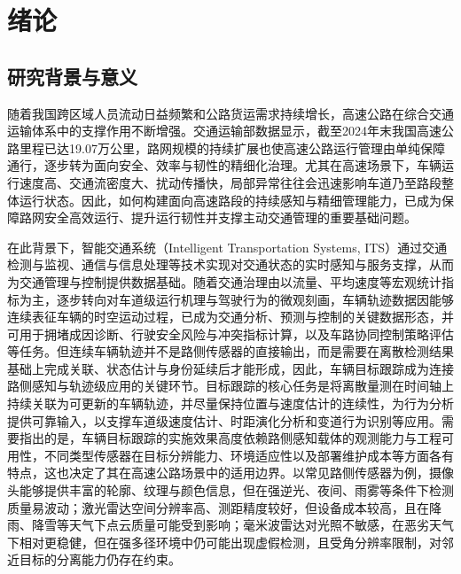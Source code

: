 \documentclass{xdupgthesis}
\begin{document}
\chapter{绪论}

\section{研究背景与意义}

随着我国跨区域人员流动日益频繁和公路货运需求持续增长，高速公路在综合交通运输体系中的支撑作用不断增强。交通运输部数据显示，截至2024年末我国高速公路里程已达19.07万公里\cite{mot2024statisticalbulletin}，路网规模的持续扩展也使高速公路运行管理由单纯保障通行，逐步转为面向安全、效率与韧性的精细化治理。尤其在高速场景下，车辆运行速度高、交通流密度大、扰动传播快，局部异常往往会迅速影响车道乃至路段整体运行状态。因此，如何构建面向高速路段的持续感知与精细管理能力，已成为保障路网安全高效运行、提升运行韧性并支撑主动交通管理的重要基础问题。

在此背景下，智能交通系统（Intelligent Transportation Systems, ITS）通过交通检测与监视、通信与信息处理等技术实现对交通状态的实时感知与服务支撑，从而为交通管理与控制提供数据基础\cite{mimbela2007vdstits}。随着交通治理由以流量、平均速度等宏观统计指标为主，逐步转向对车道级运行机理与驾驶行为的微观刻画，车辆轨迹数据因能够连续表征车辆的时空运动过程，已成为交通分析、预测与控制的关键数据形态\cite{liu2025trajectorysurvey}，并可用于拥堵成因诊断、行驶安全风险与冲突指标计算，以及车路协同控制策略评估等任务。但连续车辆轨迹并不是路侧传感器的直接输出，而是需要在离散检测结果基础上完成关联、状态估计与身份延续后才能形成，因此，车辆目标跟踪成为连接路侧感知与轨迹级应用的关键环节。目标跟踪的核心任务是将离散量测在时间轴上持续关联为可更新的车辆轨迹，并尽量保持位置与速度估计的连续性，为行为分析提供可靠输入，以支撑车道级速度估计、时距演化分析和变道行为识别等应用。需要指出的是，车辆目标跟踪的实施效果高度依赖路侧感知载体的观测能力与工程可用性，不同类型传感器在目标分辨能力、环境适应性以及部署维护成本等方面各有特点，这也决定了其在高速公路场景中的适用边界。以常见路侧传感器为例，摄像头能够提供丰富的轮廓、纹理与颜色信息，但在强逆光、夜间、雨雾等条件下检测质量易波动\cite{Pandharipande2023Perception}；激光雷达空间分辨率高、测距精度较好，但设备成本较高，且在降雨、降雪等天气下点云质量可能受到影响\cite{Pandharipande2023Perception,Wu2025LiDARAdverseWeather}；毫米波雷达对光照不敏感，在恶劣天气下相对更稳健，但在强多径环境中仍可能出现虚假检测，且受角分辨率限制，对邻近目标的分离能力仍存在约束\cite{Kong2025mmWaveSurvey}。
\end{document}

